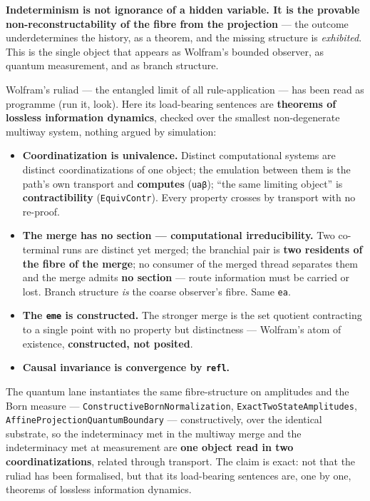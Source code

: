 \documentclass[11pt]{article}
\newcommand{\tm}[1]{\texttt{#1}}
\begin{document}
\textbf{Indeterminism is not ignorance of a hidden variable. It is the provable
non-reconstructability of the fibre from the projection} --- the outcome
underdetermines the history, as a theorem, and the missing structure is
\emph{exhibited}. This is the single object that appears as Wolfram's bounded
observer, as quantum measurement, and as branch structure.

Wolfram's ruliad --- the entangled limit of all rule-application --- has been
read as programme (run it, look). Here its load-bearing sentences are
\textbf{theorems of lossless information dynamics}, checked over the smallest
non-degenerate multiway system, nothing argued by simulation:

\begin{itemize}
  \item \textbf{Coordinatization is univalence.} Distinct computational systems
  are distinct coordinatizations of one object; the emulation between them is
  the path's own transport and \textbf{computes} (\tm{uaβ}); ``the same limiting
  object'' is \textbf{contractibility} (\tm{EquivContr}). Every property crosses
  by transport with no re-proof.
  \item \textbf{The merge has no section --- computational irreducibility.} Two
  co-terminal runs are distinct yet merged; the branchial pair is \textbf{two
  residents of the fibre of the merge}; no consumer of the merged thread
  separates them and the merge admits \textbf{no section} --- route information
  must be carried or lost. Branch structure \emph{is} the coarse observer's
  fibre. Same \tm{ea}.
  \item \textbf{The \tm{eme} is constructed.} The stronger merge is the set
  quotient contracting to a single point with no property but distinctness ---
  Wolfram's atom of existence, \textbf{constructed, not posited}.
  \item \textbf{Causal invariance is convergence by \tm{refl}.}
\end{itemize}

The quantum lane instantiates the same fibre-structure on amplitudes and the
Born measure --- \tm{ConstructiveBornNormalization}, \tm{ExactTwoStateAmplitudes},
\tm{AffineProjectionQuantumBoundary} --- constructively, over the identical
substrate, so the indeterminacy met in the multiway merge and the indeterminacy
met at measurement are \textbf{one object read in two coordinatizations},
related through transport. The claim is exact: not that the ruliad has been
formalised, but that its load-bearing sentences are, one by one, theorems of
lossless information dynamics.
\end{document}
